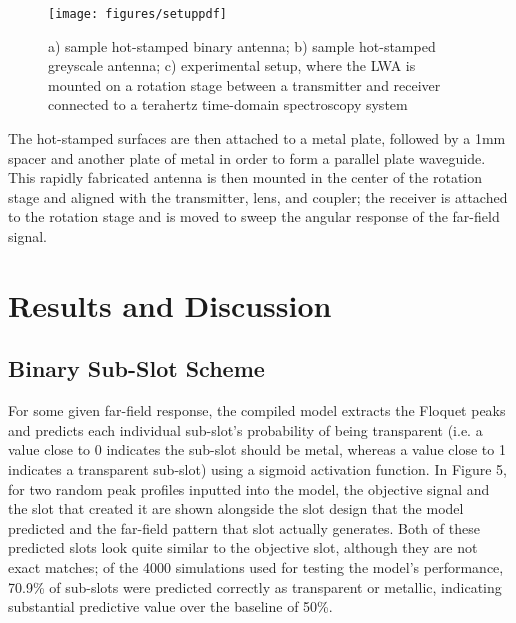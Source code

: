 \documentclass[11pt]{article}
\begin{document}
\begin{figure}[H]
	\centering
	\texttt{[image: figures/setuppdf]}
	\caption{a) sample hot-stamped binary antenna; b) sample hot-stamped greyscale antenna; c) experimental setup, where the LWA is mounted on a rotation stage between a transmitter and receiver connected to a terahertz time-domain spectroscopy system}
\end{figure}

\noindent The hot-stamped surfaces are then attached to a metal plate, followed by a 1mm spacer and another plate of metal in order to form a parallel plate waveguide. This rapidly fabricated antenna is then mounted in the center of the rotation stage and aligned with the transmitter, lens, and coupler; the receiver is attached to the rotation stage and is moved to sweep the angular response of the far-field signal.

\section*{Results and Discussion}

\subsection*{Binary Sub-Slot Scheme}

For some given far-field response, the compiled model extracts the Floquet peaks and predicts each individual sub-slot's probability of being transparent (i.e. a value close to 0 indicates the sub-slot should be metal, whereas a value close to 1 indicates a transparent sub-slot) using a sigmoid activation function. In Figure 5, for two random peak profiles inputted into the model, the objective signal and the slot that created it are shown alongside the slot design that the model predicted and the far-field pattern that slot actually generates. Both of these predicted slots look quite similar to the objective slot, although they are not exact matches; of the 4000 simulations used for testing the model's performance, 70.9\% of sub-slots were predicted correctly as transparent or metallic, indicating substantial predictive value over the baseline of 50\%. 
\end{document}
